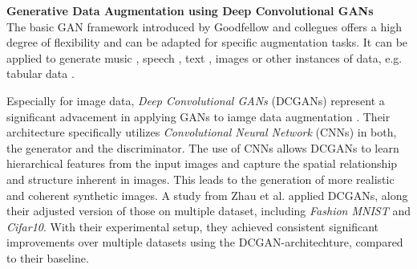 \noindent\textbf{Generative Data Augmentation using Deep Convolutional GANs}\label{dcgans_data_augmentation} \\
The basic GAN framework introduced by Goodfellow and collegues offers a high degree of flexibility and can be adapted for specific augmentation tasks. It can be applied to generate music \cite{dong2017museganmultitracksequentialgenerative}, speech \cite{li2022ttsgantransformerbasedtimeseriesgenerative}, text \cite{yu2017seqgansequencegenerativeadversarial}, images \cite{goodfellow2014generativeadversarialnetworks} or other instances of data, e.g. tabular data \cite{xu2019modelingtabulardatausing}.

Especially for image data, \textit{Deep Convolutional GANs} (DCGANs) \cite{Radford2015DCGAN} represent a significant advacement in applying GANs to iamge data augmentation \cite{huang2022tutorial}. Their architecture specifically utilizes \textit{Convolutional Neural Network} (CNNs) \cite{LeCun1989firstcnnpaper} in both, the generator and the discriminator. The use of CNNs allows DCGANs to learn hierarchical features from the input images and capture the spatial relationship and structure inherent in images. This leads to the generation of more realistic and coherent synthetic images. A study from Zhau et al. \cite{zhao2023gan} applied DCGANs, along their adjusted version of those on multiple dataset, including \textit{Fashion MNIST} and \textit{Cifar10}. With their experimental setup, they achieved consistent significant improvements over multiple datasets using the DCGAN-architechture, compared to their baseline. \\




